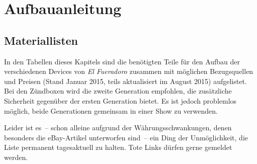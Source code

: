 \documentclass[paper=a4, parskip, numbers=noenddot, toc=listof, headsepline]{scrbook}
\newcommand{\anlage}{\emph{El Fueradoro}}
\begin{document}
	\part{Aufbauanleitung}
		\label{part:aufbauanleitung}

		\chapter{Materiallisten}

		 In den Tabellen dieses Kapitels sind die benötigten Teile für den Aufbau der verschiedenen Devices von {\anlage} zusammen mit möglichen Bezugsquellen und Preisen (Stand Januar 2015, teils aktualisiert im August 2015) aufgelistet. Bei den Zündboxen wird die zweite Generation empfohlen, die zusätzliche Sicherheit gegenüber der ersten Generation bietet. Es ist jedoch problemlos möglich, beide Generationen gemeinsam in einer Show zu verwenden.

		 Leider ist es~-- schon alleine aufgrund der Währungsschwankungen, denen besonders die eBay-Artikel unterworfen sind~-- ein Ding der Unmöglichkeit, die Liste permanent tagesaktuell zu halten. Tote Links dürfen gerne gemeldet werden.
\end{document}

